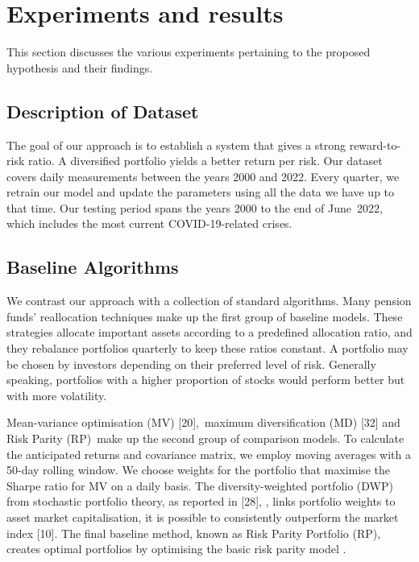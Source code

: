 \chapter{Experiments and results}
This section discusses the various experiments pertaining to the proposed hypothesis and their findings. 
\section{Description of Dataset}
The goal of our approach is to establish a system that gives a strong reward-to-risk ratio. A diversified portfolio yields a better return per risk. Our dataset covers daily measurements between the years 2000 and 2022. Every quarter, we retrain our model and update the parameters using all the data we have up to that time. Our testing period spans the years 2000 to the end of June 2022, which includes the most current COVID-19-related crises.
\section{Baseline Algorithms}
We contrast our approach with a collection of standard algorithms. Many pension funds' reallocation techniques make up the first group of baseline models. These strategies allocate important assets according to a predefined allocation ratio, and they rebalance portfolios quarterly to keep these ratios constant. A portfolio may be chosen by investors depending on their preferred level of risk. Generally speaking, portfolios with a higher proportion of stocks would perform better but with more volatility.

Mean-variance optimisation (MV) [20], maximum diversification (MD) [32] and Risk Parity (RP) make up the second group of comparison models. To calculate the anticipated returns and covariance matrix, we employ moving averages with a 50-day rolling window. We choose weights for the portfolio that maximise the Sharpe ratio for MV on a daily basis. The diversity-weighted portfolio (DWP) from stochastic portfolio theory, as reported in [28], , links portfolio weights to asset market capitalisation, it is possible to consistently outperform the market index [10]. The final baseline method, known as Risk Parity Portfolio (RP), creates optimal portfolios by optimising the basic risk parity model \cite{Bruder2012}.
